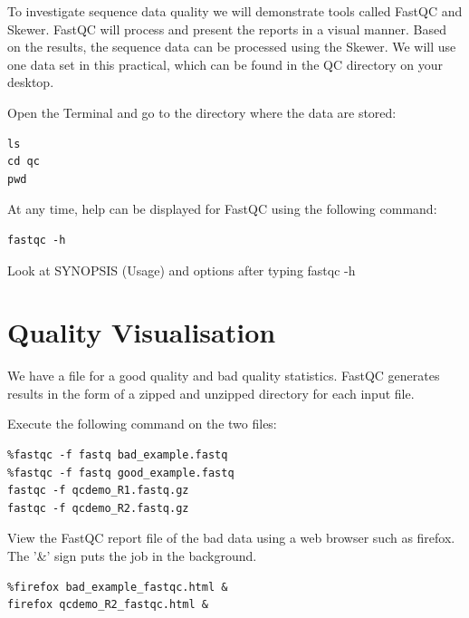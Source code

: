 \begin{information}
To investigate sequence data quality we will demonstrate tools called FastQC
and Skewer. FastQC will process and present the reports in a visual manner.
Based on the results, the sequence data can be processed using the Skewer.
We will use one data set in this practical, which can be found in the QC
directory on your desktop.
\end{information}

\begin{steps}

Open the Terminal and go to the directory where the data are stored:
\begin{lstlisting}
ls
cd qc
pwd
\end{lstlisting}

At any time, help can be displayed for FastQC using the following command:
\begin{lstlisting}
fastqc -h
\end{lstlisting}

Look at SYNOPSIS (Usage) and options after typing fastqc -h 

\end{steps}

\section{Quality Visualisation}

\begin{information}
We have a file for a good quality and bad quality statistics. FastQC generates
results in the form of a zipped and unzipped directory for each input file.
\end{information}

\begin{steps}
Execute the following command on the two files:
\begin{lstlisting}
%fastqc -f fastq bad_example.fastq 
%fastqc -f fastq good_example.fastq
fastqc -f qcdemo_R1.fastq.gz
fastqc -f qcdemo_R2.fastq.gz
\end{lstlisting}

View the FastQC report file of the bad data using a web browser such as
firefox. The '\&' sign puts the job in the background.

\begin{lstlisting}
%firefox bad_example_fastqc.html &
firefox qcdemo_R2_fastqc.html &
\end{lstlisting}

\end{steps}

